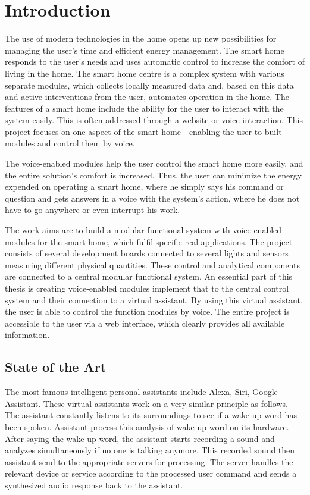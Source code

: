 \chapter{Introduction} \label{chap:introduction}

The use of modern technologies in the home opens up new possibilities for managing the user's time and efficient energy management. The smart home responds to the user's needs and uses automatic control to increase the comfort of living in the home. The smart home centre is a complex system with various separate modules, which collects locally measured data and, based on this data and active interventions from the user, automates operation in the home. The features of a smart home include the ability for the user to interact with the system easily. This is often addressed through a website or voice interaction. This project focuses on one aspect of the smart home - enabling the user to built modules and control them by voice.


The voice-enabled modules help the user control the smart home more easily, and the entire solution's comfort is increased. Thus, the user can minimize the energy expended on operating a smart home, where he simply says his command or question and gets answers in a voice with the system's action, where he does not have to go anywhere or even interrupt his work.


The work aims are to build a modular functional system with voice-enabled modules for the smart home, which fulfil specific real applications. The project consists of several development boards connected to several lights and sensors measuring different physical quantities. These control and analytical components are connected to a central modular functional system. An essential part of this thesis is creating voice-enabled modules implement that to the central control system and their connection to a virtual assistant. By using this virtual assistant, the user is able to control the function modules by voice. The entire project is accessible to the user via a web interface, which clearly provides all available information.

\section{State of the Art} \label{sec:state_of_the_art}


The most famous intelligent personal assistants include Alexa, Siri, Google Assistant. These virtual assistants work on a very similar principle as follows. The assistant constantly listens to its surroundings to see if a wake-up word has been spoken. Assistant process this analysis of wake-up word on its hardware. After saying the wake-up word, the assistant starts recording a sound and analyzes simultaneously if no one is talking anymore. This recorded sound then assistant send to the appropriate servers for processing. The server handles the relevant device or service according to the processed user command and sends a synthesized audio response back to the assistant.

